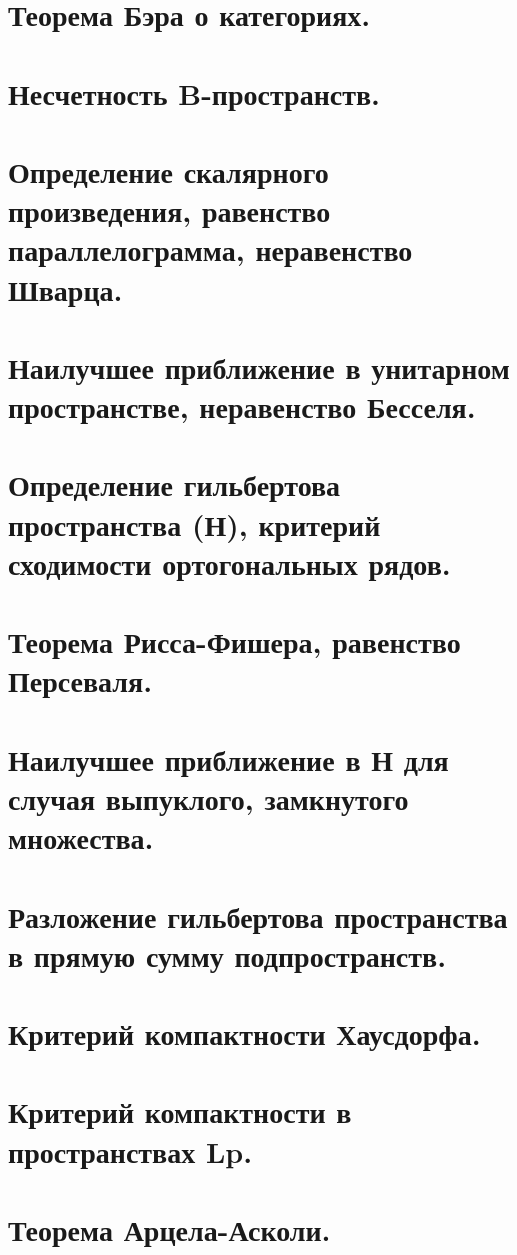 \documentclass{article}
\begin{document}
\begin{sloppypar}
\section{Теорема Бэра о категориях.}

\section{Несчетность B-пространств.}

\section{Определение скалярного произведения, равенство параллелограмма, неравенство Шварца.}

\section{Наилучшее приближение в унитарном пространстве, неравенство Бесселя.}

\section{Определение гильбертова пространства (Н), критерий сходимости ортогональных рядов.}

\section{Теорема Рисса-Фишера, равенство Персеваля.}

\section{Наилучшее приближение в Н для случая выпуклого, замкнутого множества.}

\section{Разложение гильбертова пространства в прямую сумму подпространств.}

\section{Критерий компактности Хаусдорфа.}

\section{Критерий компактности в пространствах Lp.}

\section{Теорема Арцела-Асколи.}


\end{sloppypar}
\end{document}
